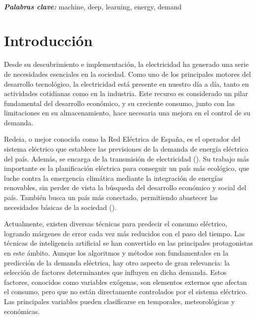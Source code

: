 \documentclass[12pt,a4paper]{report}
\providecommand{\keywords}[1]
{
  \small	
  \textbf{\textit{Palabras clave:\hspace{0.3cm}}} #1
}
\begin{document}
\


\vspace{0.5cm}

\keywords{machine, deep, learning, energy, demand}


\clearpage
\mbox{}
\thispagestyle{empty}
\newpage


\chapter{Introducción}\label{cap:cap1}


Desde su descubrimiento e implementación, la electricidad ha generado una serie de necesidades esenciales en la sociedad. Como uno de los principales motores del desarrollo tecnológico, la electricidad está presente en nuestro día a día, tanto en actividades cotidianas como en la industria. Este recurso es considerado un pilar fundamental del desarrollo económico, y su creciente consumo, junto con las limitaciones en su almacenamiento, hace necesaria una mejora en el control de su demanda.

Redeia, o mejor conocida como la Red Eléctrica de España, es el operador del sistema eléctrico que establece las previsiones de la demanda de energía eléctrica del país. Además, se encarga de la transmisión de electricidad (\cite{Wikipedia2024}). Su trabajo más importante es la planificación eléctrica para conseguir un país más ecológico, que luche contra la emergencia climática mediante la integración de energías renovables, sin perder de vista la búsqueda del desarrollo económico y social del país. También busca un país más conectado, permitiendo abastecer las necesidades básicas de la sociedad (\cite{ree2024}).

Actualmente, existen diversas técnicas para predecir el consumo eléctrico, logrando márgenes de error cada vez más reducidos con el paso del tiempo. Las técnicas de inteligencia artificial se han convertido en las principales protagonistas en este ámbito. Aunque los algoritmos y métodos son fundamentales en la predicción de la demanda eléctrica, hay otro aspecto de gran relevancia: la selección de factores determinantes que influyen en dicha demanda. Estos factores, conocidos como variables exógenas, son elementos externos que afectan el consumo, pero que no están directamente controlados por el sistema eléctrico. Las principales variables pueden clasificarse en temporales, meteorológicas y económicas.
\end{document}
